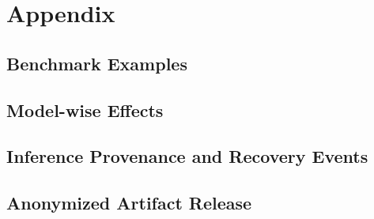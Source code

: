 \section{Appendix}

\subsection{Benchmark Examples}



\subsection{Model-wise Effects}



\subsection{Inference Provenance and Recovery Events}



\subsection{Anonymized Artifact Release}

